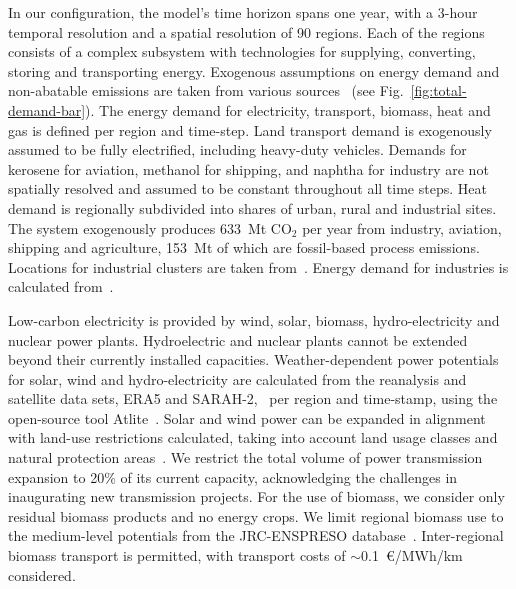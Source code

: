 \documentclass[twocolumn]{article}
\newcommand{\carbon}{CO$_2$}
\begin{document}

%
In our configuration, the model's time horizon spans one year, with a 3-hour temporal resolution and a spatial resolution of 90 regions. Each of the regions consists of a complex subsystem with technologies for supplying, converting, storing and transporting energy. Exogenous assumptions on energy demand and non-abatable emissions are taken from various sources~\cite{piamanzGeoreferencedIndustrialSites2018,muehlenpfordtTimeSeries2019,mantzosJRCIDEES20152018,NationalEmissionsReported2023,EurostatCompleteEnergyBalance,uwekrienDemandlib2023} (see Fig.~\ref{fig:total-demand-bar}). The energy demand for electricity, transport, biomass, heat and gas is defined per region and time-step.
Land transport demand is exogenously assumed to be fully electrified, including heavy-duty vehicles.
Demands for kerosene for aviation, methanol for shipping, and naphtha for industry are not spatially resolved and assumed to be constant throughout all time steps.
Heat demand is regionally subdivided into shares of urban, rural and industrial sites.
The system exogenously produces 633~Mt \carbon{} per year from industry, aviation, shipping and agriculture, 153~Mt of which are fossil-based process emissions.
Locations for industrial clusters are taken from~\cite{hotmaps_industrial_db}. Energy demand for industries is calculated from~\cite{mantzosJRCIDEES20152018}.


Low-carbon electricity is provided by wind, solar, biomass, hydro-electricity and nuclear power plants. Hydroelectric and nuclear plants cannot be extended beyond their currently installed capacities. Weather-dependent power potentials for solar, wind and hydro-electricity are calculated from the reanalysis and satellite data sets, ERA5 and SARAH-2,~\cite{hersbachERA5GlobalReanalysis2020,pfeifrothSurfaceRadiationData2017} per region and time-stamp, using the open-source tool Atlite~\cite{hofmannAtliteLightweightPython2021}.
Solar and wind power can be expanded in alignment with land-use restrictions calculated, taking into account land usage classes and natural protection areas~\cite{eeaCorineLandCover2012,eeaNatura2000Data2016}. We restrict the total volume of power transmission expansion to 20\% of its current capacity, acknowledging the challenges in inaugurating new transmission projects.
For the use of biomass, we consider only residual biomass products and no energy crops. We limit regional biomass use to the medium-level potentials from the JRC-ENSPRESO database~\cite{enspreso_database,instituteforenergyandtransportjointresearchcentreJRCEUTIMESModelBioenergy2015}. Inter-regional biomass transport is permitted, with transport costs of $\sim$0.1~€/MWh/km considered.
\end{document}
